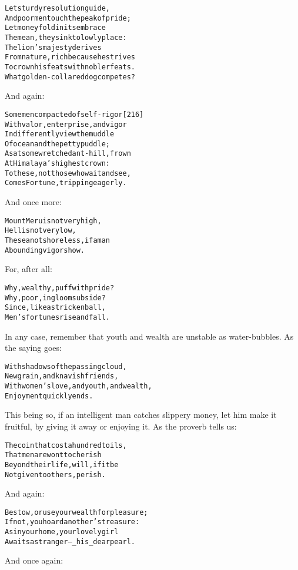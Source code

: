 \documentclass{article}
\renewenvironment{verbatim}{\begin{alltt}\normalfont\begin{centering}}{\end{centering}\end{alltt}}
\begin{document}
\begin{verbatim}
Let sturdy resolution guide,
And poor men touch the peak of pride;
Let money fold in its embrace
The mean, they sink to lowly place:
The lion's majesty derives
From nature, rich because he strives
To crown his feats with nobler feats.
What golden-collared dog competes?
\end{verbatim}
And again:

\begin{verbatim}
Some men compacted of self-rigor                        [216]
With valor, enterprise, and vigor
Indifferently view the muddle
Of ocean and the petty puddle;
As at some wretched ant-hill, frown
At Himalaya's highest crown:
To these, not those who wait and see,
Comes Fortune, tripping eagerly.
\end{verbatim}
And once more:

\begin{verbatim}
Mount Meru is not very high,
    Hell is not very low,
The sea not shoreless, if a man
    Abounding vigor show.
\end{verbatim}
For, after all:

\begin{verbatim}
Why, wealthy, puff with pride?
Why, poor, in gloom subside?
Since, like a stricken ball,
Men's fortunes rise and fall.
\end{verbatim}
In any case, remember that youth and wealth are unstable as
water-bubbles. As the saying goes:

\begin{verbatim}
With shadows of the passing cloud,
    New grain, and knavish friends,
With women's love, and youth, and wealth,
    Enjoyment quickly ends.
\end{verbatim}
This being so, if an intelligent man catches slippery money, let
him make it fruitful, by giving it away or enjoying it. As the
proverb tells us:

\begin{verbatim}
The coin that cost a hundred toils,
    That men are wont to cherish
Beyond their life, will, if it be
    Not given to others, perish.
\end{verbatim}
And again:

\begin{verbatim}
Bestow, or use your wealth for pleasure;
If not, you hoard another's treasure:
As in your home, your lovely girl
Awaits a stranger--_his_ dear pearl.
\end{verbatim}
And once again:
\end{document}
